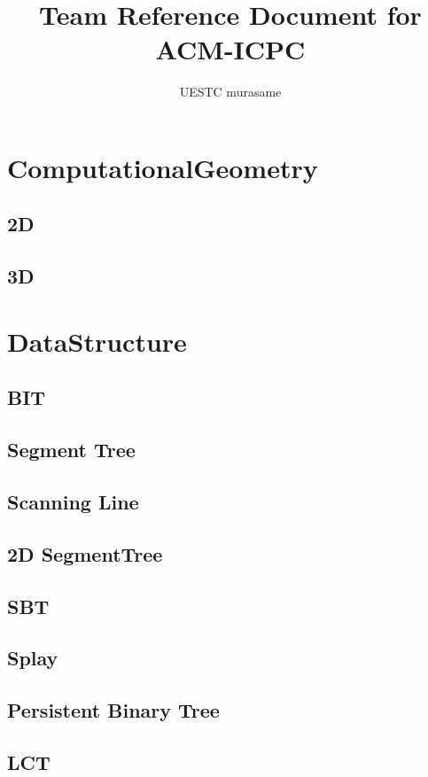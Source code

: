 \documentclass[twocolumn]{article}
\title{Team Reference Document for ACM-ICPC}
\author{UESTC murasame}
\begin{document}
\pagestyle{fancy}
\fancyhead[R]{\thepage}
\fancyfoot{}\section{ComputationalGeometry}
\subsection{2D}

\subsection{3D}

\section{DataStructure}
\subsection{BIT}

\subsection{Segment Tree}

\subsection{Scanning Line}

\subsection{2D SegmentTree}

\subsection{SBT}

\subsection{Splay}

\subsection{Persistent Binary Tree}

\subsection{LCT}

\end{document}
